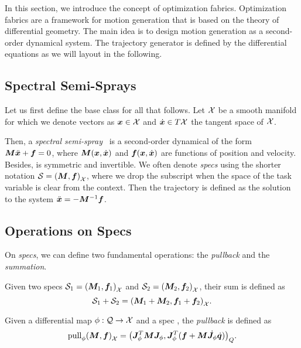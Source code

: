 In this section, we introduce the concept of optimization
fabrics. Optimization fabrics are a framework for motion
generation that is based on the theory of differential
geometry. The main idea is to design motion generation as a
second-order dynamical system. The trajectory generator is
defined by the differential equations as we will layout in
the following.

\subsection{Spectral Semi-Sprays} %
\label{sub:spectral_semi_sprays}

Let us first define the base class for all that follows.
Let $\mathcal{X}$ be a smooth manifold for which we denote vectors as 
$\bm{x}\in\mathcal{X}$ and $\dot{\bm{x}}\in T\mathcal{X}$ the tangent space of $\mathcal{X}$.

Then, a \textit{spectral semi-spray}~\cite{Ratliff2020} is a
second-order dynamical of the form $\bm{M}\ddot{\bm{x}} + \bm{f} = 0$,
where $\bm{M}(\bm{x},\dot{\bm{x}})$ and $\bm{f}(\bm{x},\dot{\bm{x}})$ are functions of
position and velocity. Besides, \M{} is symmetric and
invertible. We often denote \textit{specs} using the shorter
notation $\mathcal{S} = \left(\bm{M},\bm{f}\right)_{\mathcal{X}}$, where we drop the subscript when
the space of the task variable is clear from the context.
Then the trajectory is defined as the solution to the system
$\ddot{\bm{x}}=-\bm{M}^{-1}\bm{f}$.


\subsection{Operations on Specs} %
\label{sub:operations_on_specs}

On \textit{specs}, we can define two fundamental operations:
the \textit{pullback} and the \textit{summation}.

Given two specs $\mathcal{S}_1 = {\left(\bm{M}_1,\bm{f}_1\right)}_{\mathcal{X}}$ and
$\mathcal{S}_2 = {\left(\bm{M}_2,\bm{f}_2\right)}_{\mathcal{X}}$, their sum is
defined as
\begin{equation}
  \mathcal{S}_1 + \mathcal{S}_2 = {\left(\bm{M}_1 + \bm{M}_2, \bm{f}_1 + \bm{f}_2\right)}_{\mathcal{X}}.
  \label{eq:summation}
\end{equation}

Given a differential map $\phi: \mathcal{Q}\rightarrow\mathcal{X}$ and a spec
\spec{}, the \textit{pullback} is defined as
\begin{equation}
  \textrm{pull}_{\phi}{\left(\bm{M},\bm{f}\right)_{\mathcal{X}}} = {\left(\bm{J}^T_{\phi}\bm{M}\bm{J}_{\phi}, \bm{J}^T_{\phi}(\bm{f}+\bm{M}\dot{\bm{J}}_{\phi}\dot{\bm{q}})\right)}_{Q}.
  \label{eq:pullback}
\end{equation}

